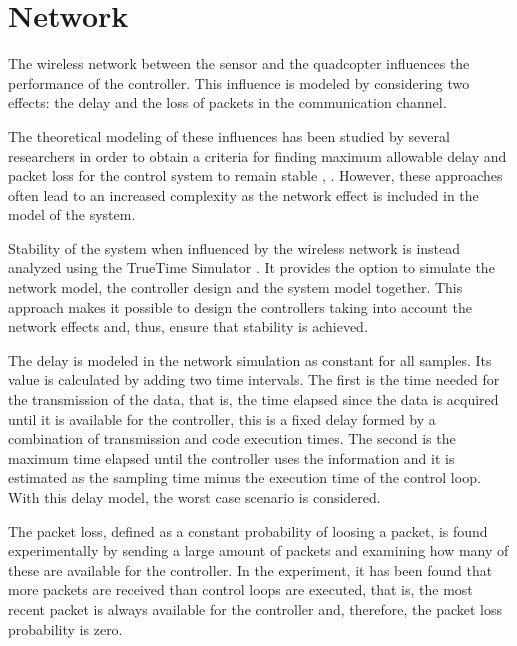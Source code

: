 \section{Network}\label{sec:network}
The wireless network between the sensor and the quadcopter influences the performance of the controller. This influence is modeled by considering two effects: the delay and the loss of packets in the communication channel.


The theoretical modeling of these influences has been studied by several researchers in order to obtain a criteria for finding maximum allowable delay and packet loss for the control system to remain stable  \cite{ling}, \cite{nirupam}. However, these approaches often lead to an increased complexity as the network effect is included in the model of the system.

Stability of the system when influenced by the wireless network is instead analyzed using the TrueTime Simulator \cite{TrueTimeNew}. It  provides the option to simulate the network model, the controller design and the system model together. This approach makes it possible to design the controllers taking into account the network effects and, thus, ensure that stability is achieved.

The delay is modeled in the network simulation as constant for all samples. Its value is calculated by adding two time intervals. The first is the time needed for the transmission of the data, that is, the time elapsed since the data is acquired until it is available for the controller, this is a fixed delay formed by a combination of transmission and code execution times. The second is the maximum time elapsed until the controller uses the information and it is estimated as the sampling time minus the execution time of the control loop. With this delay model, the worst case scenario is considered.

The packet loss, defined as a constant probability of loosing a packet, is found experimentally by sending a large amount of packets and examining how many of these are available for the controller. In the experiment, it has been found that more packets are received than control loops are executed, that is, the most recent packet is always available for the controller and, therefore, the packet loss probability is zero.